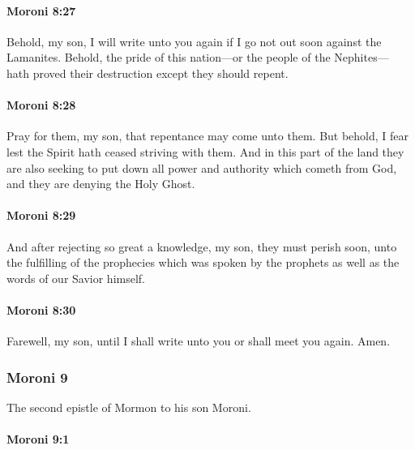 		\paragraph{Moroni 8:27} %
			\label{MORONI-8-27}

			Behold, my son, I will write unto you again
			if I go not out soon against the Lamanites.
			Behold, the pride of this nation---or the people of the Nephites---
			hath proved their destruction except they should repent.

		\paragraph{Moroni 8:28} %
			\label{MORONI-8-28}

			Pray for them, my son, that repentance may come unto them.
			But behold, I fear lest the Spirit hath ceased striving with them.
			And in this part of the land they are also seeking
			to put down all power and authority which cometh from God,
			and they are denying the Holy Ghost.

		\paragraph{Moroni 8:29} %
			\label{MORONI-8-29}

			And after rejecting so great a knowledge, my son, they must perish soon,
			unto the fulfilling of the prophecies which was spoken by the prophets
			as well as the words of our Savior himself.

		\paragraph{Moroni 8:30} %
			\label{MORONI-8-30}

			Farewell, my son, until I shall write unto you
			or shall meet you again.
			Amen.
			
	\subsubsection{Moroni 9}
		\label{MORONI-9}
		
		The second epistle of Mormon to his son Moroni.
		
		\paragraph{Moroni 9:1} %
			\label{MORONI-9-1}

